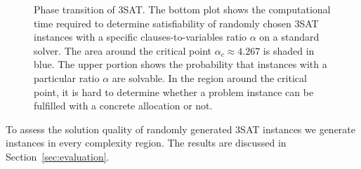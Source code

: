 \begin{figure}[t]
	\centering
	
	\caption{Phase transition of 3SAT. The bottom plot shows the computational time required to determine satisfiability of randomly chosen 3SAT instances with a specific clauses-to-variables ratio $\alpha$ on a standard solver. The area around the critical point $\alpha_{c} \approx 4.267$ is shaded in blue.\newline
          The upper portion shows the probability that instances with a particular ratio $\alpha$ are solvable. In the region around the critical point, it is hard to determine whether a problem instance can be fulfilled with a concrete allocation or not.} \label{fig:crit_sat} \end{figure}

To assess the solution quality of randomly generated 3SAT instances we generate instances in every complexity region. The results are discussed in Section~\ref{sec:evaluation}.

